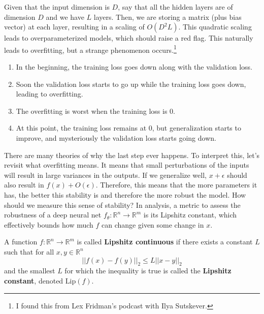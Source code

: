 \documentclass{article}
\begin{document}
  Given that the input dimension is $D$, say that all the hidden layers are of dimension $D$ and we have $L$ layers. Then, we are storing a matrix (plus bias vector) at each layer, resulting in a scaling of $O(D^2 L)$. This quadratic scaling leads to overparameterized models, which should raise a red flag. This naturally leads to overfitting, but a strange phenomenon occurs.\footnote{I found this from Lex Fridman's podcast with Ilya Sutskever.}  
  \begin{enumerate}
    \item In the beginning, the training loss goes down along with the validation loss. 
    \item Soon the validation loss starts to go up while the training loss goes down, leading to overfitting. 
    \item The overfitting is worst when the training loss is $0$. 
    \item At this point, the training loss remains at $0$, but generalization starts to improve, and mysteriously the validation loss starts going down. 
  \end{enumerate}

  There are many theories of why the last step ever happens. To interpret this, let's revisit what overfitting means. It means that small perturbations of the inputs will result in large variances in the outputs. If we generalize well, $x + \epsilon$ should also result in $f(x) + O(\epsilon)$. Therefore, this means that the more parameters it has, the better this stability is and therefore the more robust the model. How should we measure this sense of stability? In analysis, a metric to assess the robustness of a deep neural net $f_\theta: \mathbb{R}^n \longrightarrow \mathbb{R}^m$ is its Lipshitz constant, which effectively bounds how much $f$ can change given some change in $x$. 

  \begin{definition}
    A function $f: \mathbb{R}^n \longrightarrow \mathbb{R}^m$ is called \textbf{Lipshitz continuous} if there exists a constant $L$ such that for all $x, y \in \mathbb{R}^n$
    \begin{equation}
      ||f(x) - f(y)||_2 \leq L ||x - y||_2
    \end{equation}
    and the smallest $L$ for which the inequality is true is called the \textbf{Lipshitz constant}, denoted $\mathrm{Lip}(f)$. 
  \end{definition}
\end{document}
